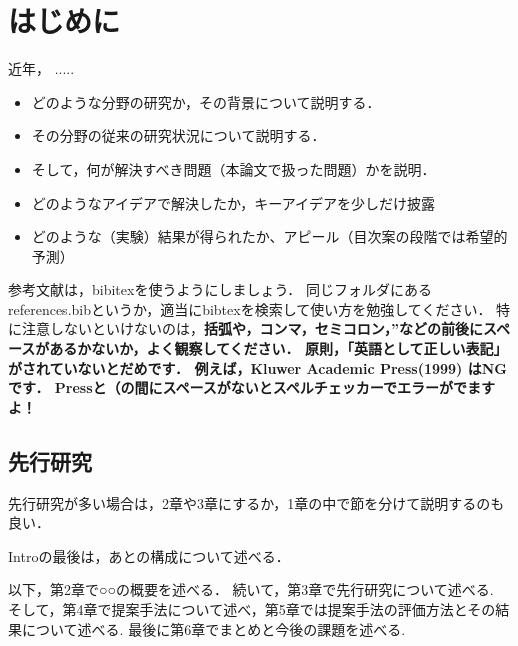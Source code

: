 \chapter{はじめに}
近年， .....


\begin{itemize}
 \setlength{\parskip}{0cm} %
 \setlength{\itemsep}{0cm} %
 \item どのような分野の研究か，その背景について説明する．
 \item その分野の従来の研究状況について説明する．
 \item そして，何が解決すべき問題（本論文で扱った問題）かを説明．
 \item どのようなアイデアで解決したか，キーアイデアを少しだけ披露
 \item どのような（実験）結果が得られたか、アピール（目次案の段階では希望的予測）
\end{itemize}

参考文献は，bibitexを使うようにしましょう\cite{栗原一貴2006プレゼン先生}．
同じフォルダにあるreferences.bibというか，適当にbibtexを検索して使い方を勉強してください．
特に注意しないといけないのは，{\bf 括弧や，コンマ，セミコロン，''などの前後にスペースがあるかないか，よく観察してください．
原則，「英語として正しい表記」がされていないとだめです．
例えば，Kluwer Academic Press(1999) はNGです．
Pressと（の間にスペースがないとスペルチェッカーでエラーがでますよ！}


 \section{先行研究}
 先行研究が多い場合は，2章や3章にするか，1章の中で節を分けて説明するのも良い．

 Introの最後は，あとの構成について述べる．

 以下，第2章で○○の概要を述べる．
 続いて，第3章で先行研究について述べる.
 そして，第4章で提案手法について述べ，第5章では提案手法の評価方法とその結果について述べる.
 最後に第6章でまとめと今後の課題を述べる.
